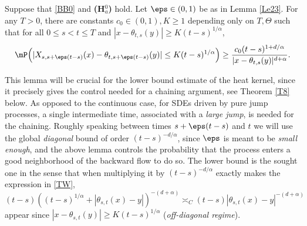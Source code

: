 \begin{lemma}\label{Le26}
Suppose that \eqref{BB0} and {\bf (H$^0_a$)} hold. Let $\eps\in(0,1)$ be as in Lemma \ref{Le23}. For any $T>0$,
there are constants $c_0\in(0,1),K\geq 1$ depending only on $T,\Theta$
such that for all $0\leq s<t\leq T$ and $|x-\theta_{t,s}(y)|\geq K(t-s)^{1/\alpha}$,
\[
\mP\Bigl(|X_{s,s+\eps(t-s)}(x)-\theta_{t,s+\eps(t-s)}(y)|\leq K(t-s)^{1/\alpha}\Bigr)\geq \frac{c_0(t-s)^{1+d/\alpha}}{|x-\theta_{t,s}(y)|^{d+\alpha}}.
\]
\end{lemma}
This lemma will be crucial for the lower bound estimate of the heat kernel, since it precisely gives the control needed for a chaining argument, see Theorem \ref{T8} below. As opposed to the continuous case, for SDEs driven by pure jump processes, a single intermediate time, associated with a \textit{large jump}, is needed for the chaining. Roughly speaking between times $s+\eps(t-s)$ and $t$ we will use the global \textit{diagonal} bound of order $(t-s)^{-d/\alpha} $, since $ \eps$ is meant to be \textit{small enough}, and the above lemma controls the probability that the process enters a good neighborhood of the backward flow to do so. The lower bound is the sought one in the sense that when
multiplying it by $(t-s)^{-d/\alpha}$ exactly makes the expression in \eqref{TW},
$ (t-s)((t-s)^{1/\alpha}+|\theta_{s,t}(x)-y|)^{-(d+\alpha)}\asymp_C (t-s)|\theta_{s,t}(x)-y|^{-(d+\alpha)}$ appear since $|x-\theta_{s,t}(y)|\ge K(t-s)^{1/\alpha} $ (\textit{off-diagonal regime}).


